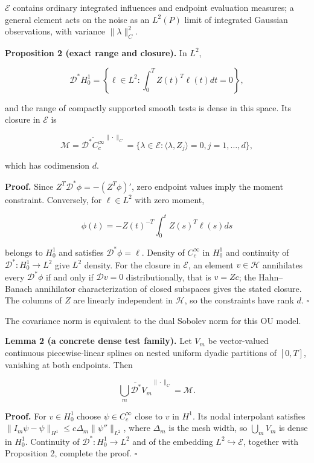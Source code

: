 \documentclass[ejs]{imsart}
\begin{document}
\(\mathcal E\) contains ordinary integrated influences and endpoint
evaluation measures; a general element acts on the noise as an
\(L^2(P)\) limit of integrated Gaussian observations, with variance
\(\|\lambda\|_C^2\).

\textbf{Proposition 2 (exact range and closure).} In \(L^2\),

\[
\mathcal D^*H_0^1
=\left\{\ell\in L^2:\int_0^T Z(t)^T\ell(t)dt=0\right\},
\]

and the range of compactly supported smooth tests is dense in this
space. Its closure in \(\mathcal E\) is

\[
\mathcal M=\overline{\mathcal D^*C_c^\infty}^{\|\cdot\|_C}
=\{\lambda\in\mathcal E:\langle\lambda,Z_j\rangle=0, j=1,\ldots,d\},
\]

which has codimension \(d\).

\textbf{Proof.} Since \(Z^T\mathcal D^*\phi=-(Z^T\phi)'\), zero endpoint
values imply the moment constraint. Conversely, for \(\ell\in L^2\) with
zero moment,

\[
\phi(t)=-Z(t)^{-T}\int_0^t Z(s)^T\ell(s)ds
\]

belongs to \(H_0^1\) and satisfies \(\mathcal D^*\phi=\ell\). Density of
\(C_c^\infty\) in \(H_0^1\) and continuity of
\(\mathcal D^*:H_0^1\to L^2\) give \(L^2\) density. For the closure in
\(\mathcal E\), an element \(v\in\mathcal H\) annihilates every
\(\mathcal D^*\phi\) if and only if \(\mathcal D v=0\) distributionally,
that is \(v=Zc\); the Hahn--Banach annihilator characterization of
closed subspaces gives the stated closure. The columns of \(Z\) are
linearly independent in \(\mathcal H\), so the constraints have rank
\(d\). \(\square\)

The covariance norm is equivalent to the dual Sobolev norm for this OU
model.

\textbf{Lemma 2 (a concrete dense test family).} Let \(V_m\) be
vector-valued continuous piecewise-linear splines on nested uniform
dyadic partitions of \([0,T]\), vanishing at both endpoints. Then

\[
\overline{\bigcup_m\mathcal D^*V_m}^{\|\cdot\|_C}=\mathcal M.
\]

\textbf{Proof.} For \(v\in H_0^1\) choose \(\psi\in C_c^\infty\) close
to \(v\) in \(H^1\). Its nodal interpolant satisfies
\(\|I_m\psi-\psi\|_{H^1}\leq c\Delta_m\|\psi''\|_{L^2}\), where
\(\Delta_m\) is the mesh width, so \(\bigcup_mV_m\) is dense in
\(H_0^1\). Continuity of \(\mathcal D^*:H_0^1\to L^2\) and of the
embedding \(L^2\hookrightarrow\mathcal E\), together with Proposition 2,
complete the proof. \(\square\)
\end{document}
